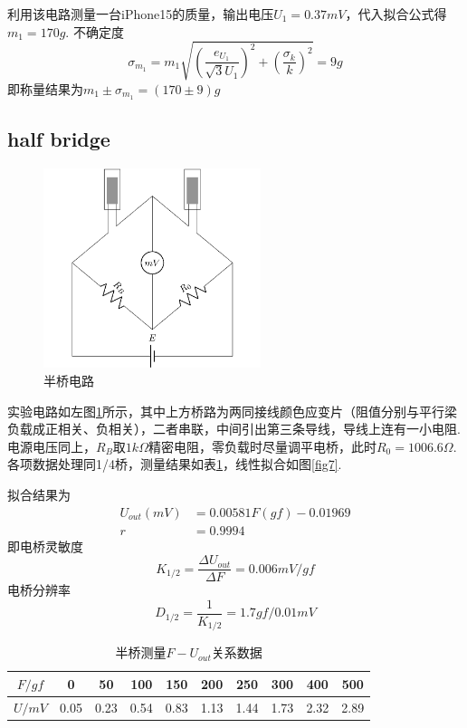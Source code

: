 \documentclass[12pt, a4paper]{ctexart}
\begin{document}
利用该电路测量一台iPhone15的质量，输出电压$U_1 = 0.37mV$，代入拟合公式得$m_1 = 170g$.
不确定度
\begin{equation*}
    \sigma_{m_1} = m_1 \sqrt{(\frac{e_{U_1}}{\sqrt{3}U_1})^2 + (\frac{\sigma_k}{k})^2} = 9g
\end{equation*}
即称量结果为$m_1 \pm \sigma_{m_1} = (170 \pm 9)g$

\subsection{half bridge}

\begin{figure}
    \includegraphics[width=2.5in]{figure/half bridge.png}
    \caption{半桥电路}
    \label{fig6}
\end{figure}

实验电路如左图\ref{fig6}所示，其中上方桥路为两同接线颜色应变片（阻值分别与平行梁负载成正相关、负相关），二者串联，中间引出第三条导线，导线上连有一小电阻.
电源电压同上，$R_B$取$1k\Omega$精密电阻，零负载时尽量调平电桥，此时$R_0 = 1006.6\Omega$.
各项数据处理同1/4桥，测量结果如表\ref{t7}，线性拟合如图\ref{fig7}.

拟合结果为
\begin{align*}
    U_{out}(mV) &= 0.00581F(gf)- 0.01969 \\
    r &= 0.9994
\end{align*}
即电桥灵敏度
\begin{equation*}
    K_{1/2} = \frac{\Delta U_{out}}{\Delta F} = 0.006mV/gf
\end{equation*}
电桥分辨率
\begin{equation*}
    D_{1/2} = \frac{1}{K_{1/2}} = 1.7gf/0.01mV
\end{equation*}

\begin{table}[htbp]
    \centering
    \begin{tabular}{cccccccccc}
        \toprule
        $F/gf$ & 0 & 50 & 100 & 150 & 200 & 250 & 300 & 400 & 500 \\
        \midrule
        $U/mV$ & 0.05 & 0.23 & 0.54 & 0.83 & 1.13 & 1.44 & 1.73 & 2.32 & 2.89 \\
        \bottomrule
    \end{tabular}
    \caption{半桥测量$F-U_{out}$关系数据}
    \label{t7}
\end{table}
\end{document}

